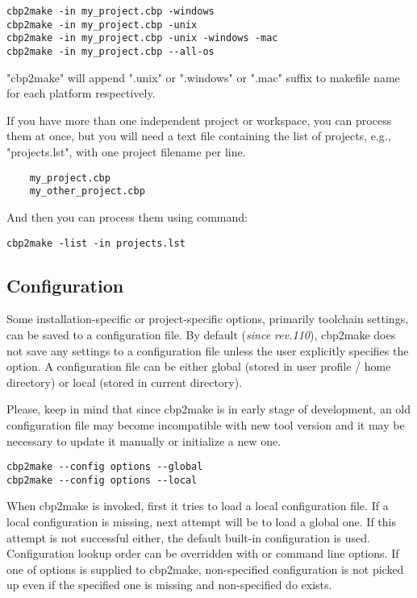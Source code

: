 \begin{lstlisting}
cbp2make -in my_project.cbp -windows
cbp2make -in my_project.cbp -unix
cbp2make -in my_project.cbp -unix -windows -mac
cbp2make -in my_project.cbp --all-os
\end{lstlisting}
"cbp2make" will append ".unix" or ".windows" or ".mac" suffix to makefile name for each platform respectively.

If you have more than one independent project or workspace, you can process them at once, but you will need a text file containing the list of projects, e.g., "projects.lst", with one project filename per line.

\begin{lstlisting}
    my_project.cbp
    my_other_project.cbp 
\end{lstlisting}

And then you can process them using command:
\begin{lstlisting}
cbp2make -list -in projects.lst
\end{lstlisting}

\subsection{Configuration}

Some installation-specific or project-specific options, primarily toolchain settings, can be saved to a configuration file. By default (\textit{since rev.110}), cbp2make does not save any settings to a configuration file unless the user explicitly specifies the  option. A configuration file can be either global (stored in user profile / home directory) or local (stored in current directory).

Please, keep in mind that since cbp2make is in early stage of development, an old configuration file may become incompatible with new tool version and it may be necessary to update it manually or initialize a new one.


\begin{lstlisting}
cbp2make --config options --global
cbp2make --config options --local
\end{lstlisting}


When cbp2make is invoked, first it tries to load a local configuration file. If a local configuration is missing, next attempt will be to load a global one. If this attempt is not successful either, the default built-in configuration is used. Configuration lookup order can be overridden with  or  command line options. If one of options is supplied to cbp2make, non-specified configuration is not picked up even if the specified one is missing and non-specified do exists.

